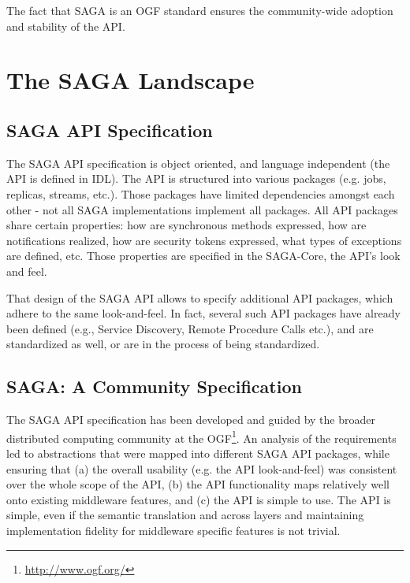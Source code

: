 \documentclass[10pt,conference,final,letterpaper,twoside,twocolumn,]{IEEEtran}
\begin{document}
The fact that SAGA is an OGF standard ensures the community-wide
adoption and stability of the
API.


\section{The SAGA Landscape}

 \subsection{SAGA API Specification}

  The SAGA API specification is object oriented, and language
  independent (the API is defined in IDL).  The API is structured into
  various packages (e.g. jobs, replicas, streams, etc.).  Those
  packages have limited dependencies amongst each other - not all SAGA
  implementations implement all packages.  All API packages share
  certain properties: how are synchronous methods expressed, how are
  notifications realized, how are security tokens expressed, what
  types of exceptions are defined, etc.  Those properties are
  specified in the SAGA-Core, the API's look and feel.

  That design of the SAGA API allows to specify additional API
  packages, which adhere to the same look-and-feel.  In fact, several
  such API packages have already been defined (e.g., Service
  Discovery, Remote Procedure Calls etc.), and are standardized as
  well, or are in the process of being standardized.

 \subsection{SAGA: A Community Specification}

  The SAGA API specification has been developed and guided by the
  broader distributed computing community at the
  OGF\footnote{\url{http://www.ogf.org/}}.  An analysis of the
  requirements led to abstractions that were mapped into different
  SAGA API packages, while ensuring that (a) the overall usability
  (e.g. the API look-and-feel) was consistent over the whole scope of
  the API, (b) the API functionality maps relatively well onto
  existing middleware features, and (c) the API is simple to use.  The
  API is simple, even if the semantic translation and across layers
  and maintaining implementation fidelity for middleware specific
  features is not trivial.
\end{document}
